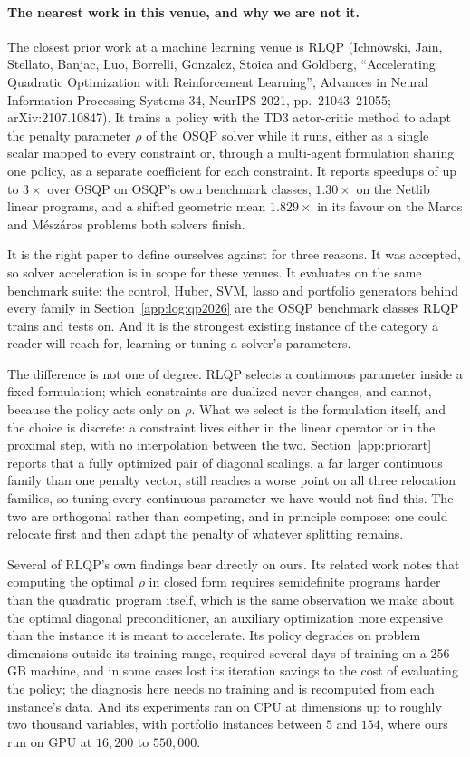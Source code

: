 \documentclass[11pt]{article}
\begin{document}
\paragraph{The nearest work in this venue, and why we are not it.}
The closest prior work at a machine learning venue is RLQP (Ichnowski, Jain,
Stellato, Banjac, Luo, Borrelli, Gonzalez, Stoica and Goldberg,
``Accelerating Quadratic Optimization with Reinforcement Learning'',
Advances in Neural Information Processing Systems 34, NeurIPS 2021,
pp.~21043--21055; arXiv:2107.10847). It trains a policy with the TD3
actor-critic method to adapt the penalty parameter $\rho$ of the OSQP
solver while it runs, either as a single scalar mapped to every constraint
or, through a multi-agent formulation sharing one policy, as a separate
coefficient for each constraint. It reports speedups of up to $3\times$ over
OSQP on OSQP's own benchmark classes, $1.30\times$ on the Netlib linear
programs, and a shifted geometric mean $1.829\times$ in its favour on the
Maros and M\'esz\'aros problems both solvers finish.

It is the right paper to define ourselves against for three reasons. It was
accepted, so solver acceleration is in scope for these venues. It evaluates on
the same benchmark suite: the control, Huber, SVM, lasso and portfolio
generators behind every family in Section~\ref{app:log:qp2026} are the
OSQP benchmark classes RLQP trains and tests on. And it is the strongest
existing instance of the category a reader will reach for, learning or tuning
a solver's parameters.

The difference is not one of degree. RLQP selects a continuous parameter
inside a fixed formulation; which constraints are dualized never changes, and
cannot, because the policy acts only on $\rho$. What we select is the
formulation itself, and the choice is discrete: a constraint lives either in
the linear operator or in the proximal step, with no interpolation between
the two. Section~\ref{app:priorart} reports that a fully optimized pair of
diagonal scalings, a far larger continuous family than one penalty vector,
still reaches a worse point on all three relocation families, so tuning every
continuous parameter we have would not find this. The two are orthogonal
rather than competing, and in principle compose: one could relocate first and
then adapt the penalty of whatever splitting remains.

Several of RLQP's own findings bear directly on ours. Its related work notes
that computing the optimal $\rho$ in closed form requires semidefinite
programs harder than the quadratic program itself, which is the same
observation we make about the optimal diagonal preconditioner, an auxiliary
optimization more expensive than the instance it is meant to accelerate. Its
policy degrades on problem dimensions outside its training range, required
several days of training on a 256\,GB machine, and in some cases lost its
iteration savings to the cost of evaluating the policy; the diagnosis here
needs no training and is recomputed from each instance's data. And its
experiments ran on CPU at dimensions up to roughly two thousand variables,
with portfolio instances between $5$ and $154$, where ours run on GPU at
$16{,}200$ to $550{,}000$.
\end{document}
